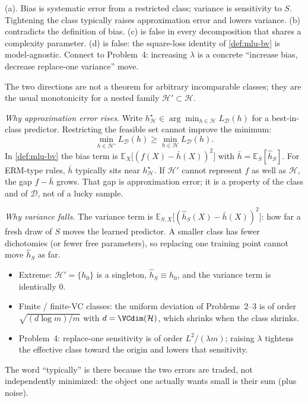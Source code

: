 \begin{solution}
(a). Bias is systematic error from a restricted class; variance is sensitivity to $S$. Tightening the class typically raises approximation error and lowers variance. (b) contradicts the definition of bias. (c) is false in every decomposition that shares a complexity parameter. (d) is false: the square-loss identity of \cref{def:mlu-bv} is model-agnostic. Connect to Problem~4: increasing $\lambda$ is a concrete ``increase bias, decrease replace-one variance'' move.

The two directions are not a theorem for arbitrary incomparable classes; they are the usual monotonicity for a nested family $\mathcal{H}'\subset\mathcal{H}$.

\textit{Why approximation error rises.}
Write $h^\star_{\mathcal{H}}\in\arg\min_{h\in\mathcal{H}}L_{\mathcal{D}}(h)$ for a best-in-class predictor. Restricting the feasible set cannot improve the minimum:
\[
\min_{h\in\mathcal{H}'}L_{\mathcal{D}}(h)
\ge
\min_{h\in\mathcal{H}}L_{\mathcal{D}}(h).
\]
In \cref{def:mlu-bv} the bias term is $\mathbb{E}_X\bigl[(f(X)-\bar h(X))^2\bigr]$ with $\bar h=\mathbb{E}_S[\widehat h_S]$. For ERM-type rules, $\bar h$ typically sits near $h^\star_{\mathcal{H}}$. If $\mathcal{H}'$ cannot represent $f$ as well as $\mathcal{H}$, the gap $f-\bar h$ grows. That gap is approximation error; it is a property of the class and of $\mathcal{D}$, not of a lucky sample.

\textit{Why variance falls.}
The variance term is $\mathbb{E}_{S,X}\bigl[(\widehat h_S(X)-\bar h(X))^2\bigr]$: how far a fresh draw of $S$ moves the learned predictor. A smaller class has fewer dichotomies (or fewer free parameters), so replacing one training point cannot move $\widehat h_S$ as far.
\begin{itemize}
    \item Extreme: $\mathcal{H}'=\{h_0\}$ is a singleton, $\widehat h_S\equiv h_0$, and the variance term is identically $0$.
    \item Finite / finite-VC classes: the uniform deviation of Problems~2--3 is of order $\sqrt{(d\log m)/m}$ with $d=\VCdim(\mathcal{H})$, which shrinks when the class shrinks.
    \item Problem~4: replace-one sensitivity is of order $L^2/(\lambda m)$; raising $\lambda$ tightens the effective class toward the origin and lowers that sensitivity.
\end{itemize}
The word ``typically'' is there because the two errors are traded, not independently minimized: the object one actually wants small is their sum (plus noise).
\end{solution}

